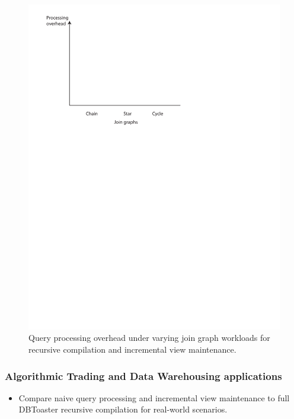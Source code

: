 \documentclass{sig-alternate}
\begin{document}
\begin{figure}
\includegraphics[scale=0.6]{figures/axes-jgraph.pdf}
\caption{Query processing overhead under varying join graph workloads for
recursive compilation and incremental view maintenance.}
\label{fig:overhead-workload-join}
\end{figure}

\subsubsection{Algorithmic Trading and Data Warehousing applications}
\begin{itemize}
\item Compare naive query processing and incremental view maintenance to full
DBToaster recursive compilation for real-world scenarios.
\end{itemize}
\end{document}
